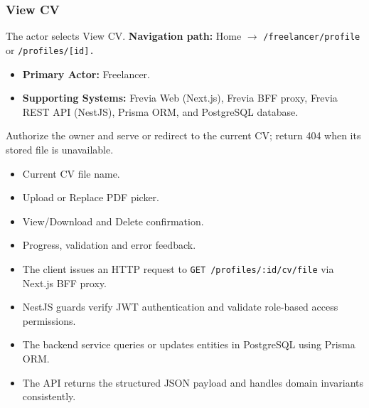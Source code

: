 \subsubsection{View CV}

The actor selects View CV.\newline
\textbf{Navigation path:} Home $\rightarrow$ \texttt{/\allowbreak{}freelancer/\allowbreak{}profile} or \texttt{/\allowbreak{}profiles/\allowbreak{}[id].}


\begin{itemize}[leftmargin=1.6em,topsep=3pt,itemsep=2pt,parsep=0pt,label=$\bullet$]
    \item \textbf{Primary Actor:} Freelancer.
    \item \textbf{Supporting Systems:} Frevia Web (Next.js), Frevia BFF proxy, Frevia REST API (NestJS), Prisma ORM, and PostgreSQL database.
\end{itemize}

\noindent Authorize the owner and serve or redirect to the current CV; return 404 when its stored file is unavailable.

\begin{itemize}[leftmargin=1.6em,topsep=3pt,itemsep=2pt,parsep=0pt,label=$\bullet$]
    \item Current CV file name.
    \item Upload or Replace PDF picker.
    \item View/Download and Delete confirmation.
    \item Progress, validation and error feedback.
\end{itemize}

\begin{itemize}[leftmargin=1.6em,topsep=3pt,itemsep=2pt,parsep=0pt,label=$\bullet$]
    \item The client issues an HTTP request to \texttt{GET /\allowbreak{}profiles/\allowbreak{}:\allowbreak{}id/\allowbreak{}cv/\allowbreak{}file} via Next.js BFF proxy.
    \item NestJS guards verify JWT authentication and validate role-based access permissions.
    \item The backend service queries or updates entities in PostgreSQL using Prisma ORM.
    \item The API returns the structured JSON payload and handles domain invariants consistently.
\end{itemize}

